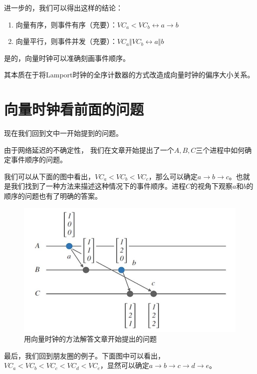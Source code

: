 \documentclass[cn,11pt,chinese]{elegantbook}
\providecommand{\tightlist}{%
  \setlength{\itemsep}{0pt}\setlength{\parskip}{0pt}}
\begin{document}
进一步的，我们可以得出这样的结论：

\begin{enumerate}
\def\labelenumi{\arabic{enumi}.}
\tightlist
\item
  向量有序，则事件有序（充要）：\(VC_a < VC_b \leftrightarrow a \rightarrow b\)
\item
  向量平行，则事件并发（充要）：\(VC_a \Vert VC_b \leftrightarrow a \Vert b\)
\end{enumerate}

是的，向量时钟可以准确刻画事件顺序。

其本质在于将Lamport时钟的全序计数器的方式改造成向量时钟的偏序大小关系。

\hypertarget{ux5411ux91cfux65f6ux949fux770bux524dux9762ux7684ux95eeux9898}{%
\section{向量时钟看前面的问题}\label{ux5411ux91cfux65f6ux949fux770bux524dux9762ux7684ux95eeux9898}}

现在我们回到文中一开始提到的问题。

由于网络延迟的不确定性，
我们在文章开始提出了一个\(A,B,C\)三个进程中如何确定事件顺序的问题。

我们可以从下面的图中看出，\(VC_a < VC_b < VC_c\)，那么可以确定\(a \rightarrow b \rightarrow c\)。也就是我们找到了一种方法来描述这种情况下的事件顺序。进程\(C\)的视角下观察\(a\)和\(b\)的顺序的问题也有了明确的答案。

\begin{figure}
\centering
\includegraphics{images/appendix-a-16.jpeg}
\caption{用向量时钟的方法解答文章开始提出的问题}
\end{figure}

最后，我们回到朋友圈的例子。下面图中可以看出，\(VC_a < VC_b < VC_c < VC_d < VC_e\)，显然可以确定\(a \rightarrow b \rightarrow c \rightarrow d \rightarrow e\)。
\end{document}
